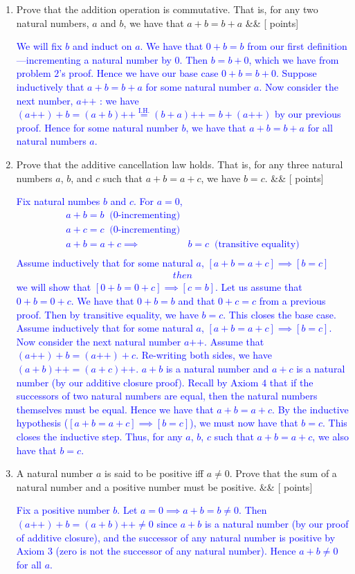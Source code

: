 \documentclass[12pt]{article}
\newcommand{\points}[1]{\hfill {[#1 points]}}
\newcommand{\problem}[2][]{%
  \item {#2}%
  \ifx&#1&%
  \else%
    \points{#1}%
  \fi
  \par\vspace{0.5em}
}
\begin{document}
\begin{enumerate}[leftmargin=*, label=\textbf{\arabic*.}]
	 \problem{Prove that the addition operation is commutative. That is, for any two natural numbers, $a$ and $b$, we have that $a+b = b+a$}
    	\textcolor{blue}{We will fix $b$ and induct on $a$. We have that $0 + b = b$ from our first definition—incrementing a natural number by 0. Then $b = b + 0$, which we have from problem $2$'s proof. Hence we have our base case $0 + b = b + 0$. Suppose inductively that $a + b = b + a$ for some natural number $a$. Now consider the next number, $a\text{++}$ : we have $(a\text{++}) + b = (a + b)\text{++} \overset{\text{I.H.}}{=} (b + a)\text{++} = b+(a\text{++})$ by our previous proof. Hence for some natural number $b$, we have that $a + b = b + a$ for all natural numbers $a$.}
	
	
	\problem{Prove that the additive cancellation law holds. That is, for any three natural numbers $a$, $b$, and $c$ such that $a + b = a + c$, we have $b = c$.}
    	\textcolor{blue}{Fix natural numbes $b$ and $c$. For $a=0$, 
	\begin{align*}
	a+b = b \;\; \text{($0$-incrementing)} \\
	a+c = c \;\; \text{($0$-incrementing)} \\
	a+b=a+c \implies& b = c \;\; \text{(transitive equality)}\\
	\end{align*}
	Assume inductively that for some natural $a$, $[a+b=a+c] \implies [b=c]$
	\begin{align*}
	then	
	\end{align*}
	we will show that $[0+b=0+c] \implies [c=b]$. Let us assume that $0+b=0+c$. We have that $0+b=b$ and that $0+c=c$ from a previous proof. Then by transitive equality, we have $b=c$. This closes the base case. Assume inductively that for some natural $a$, $[a+b=a+c] \implies [b=c]$. Now consider the next natural number $a\text{++}$. Assume that $(a\text{++})+b=(a\text{++})+c$. Re-writing both sides, we have $(a+b)\text{++} = (a+c)\text{++}$. $a+b$ is a natural number and $a+c$ is a natural number (by our additive closure proof). Recall by Axiom $4$ that if the successors of two natural numbers are equal, then the natural numbers themselves must be equal. Hence we have that $a+b = a+c$. By the inductive hypothesis ($[a+b=a+c]  \implies [b=c]$), we must now have that $b=c$. This closes the inductive step. Thus, for any $a$, $b$, $c$ such that $a + b = a + c$, we also have that $b = c$.}
	
	\problem{A natural number $a$ is said to be positive iff $a \neq 0$. Prove that the sum of a natural number and a positive number must be positive.}
	\textcolor{blue}{Fix a positive number $b$. Let $a = 0 \implies a + b = b \neq 0$. Then $(a\text{++}) + b = (a+b)\text{++} \neq 0$ since $a + b$ is a natural number (by our proof of additive closure), and the successor of any natural number is positive by Axiom $3$ (zero is not the successor of any natural number). Hence $a + b \neq 0$ for all $a$.}
	

\end{enumerate}
\end{document}

